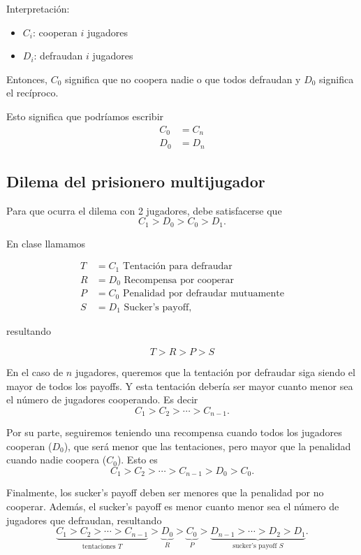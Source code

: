 \documentclass[twocolumn,aps,prl]{revtex4-1}
\begin{document}
Interpretación:

\begin{itemize}
    \item $C_i$: cooperan $i$ jugadores
    \item $D_i$: defraudan $i$ jugadores
\end{itemize}


Entonces, $C_0$ significa que no coopera nadie o que todos defraudan y $D_0$ significa el recíproco.

Esto significa que podríamos escribir
$$
\begin{aligned}
    C_0 &= C_n \\
    D_0 &= D_n
\end{aligned}
$$

\subsection{Dilema del prisionero multijugador}

Para que ocurra el dilema con 2 jugadores, debe satisfacerse que
$$
C_1 > D_0 > C_0 > D_1.
$$

En clase llamamos

$$
\begin{aligned}
    T &= C_1 \text{ Tentación para defraudar}\\
    R &= D_0 \text{ Recompensa por cooperar}\\
    P &= C_0 \text{ Penalidad por defraudar mutuamente}\\
    S &= D_1 \text{ Sucker's payoff},
\end{aligned}
$$

resultando

$$
T > R > P > S
$$

En el caso de $n$ jugadores, queremos que la tentación por defraudar siga siendo el mayor de todos los payoffs. Y esta tentación debería ser mayor cuanto menor sea el número de jugadores cooperando. Es decir
$$
C_1 > C_2 > \cdots > C_{n-1}.
$$

Por su parte, seguiremos teniendo una recompensa cuando todos los jugadores cooperan ($D_0$), que será menor que las tentaciones, pero mayor que la penalidad cuando nadie coopera ($C_0$). Esto es
$$
C_1 > C_2 > \cdots > C_{n-1} > D_0 > C_0.
$$

Finalmente, los sucker's payoff deben ser menores que la penalidad por no cooperar. Además, el sucker's payoff es menor cuanto menor sea el número de jugadores que defraudan, resultando
$$
\underbrace{C_1 > C_2 > \cdots > C_{n-1}}_{\text{tentaciones } T} > \underbrace{D_0}_{R} > \underbrace{C_0}_{P} > \underbrace{D_{n-1} > \cdots > D_2 > D_1}_{\text{sucker's payoff } S}.
$$

% 
\end{document}
